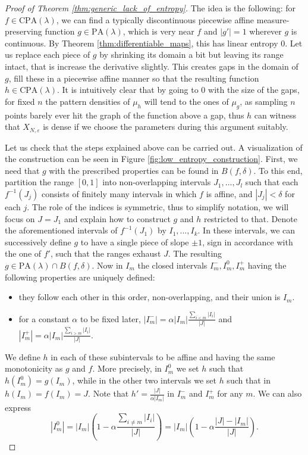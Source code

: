 \documentclass[11pt]{article}
\theoremstyle{definition}
\begin{document}
\begin{proof}[Proof of Theorem \ref{thm:generic_lack_of_entropy}]
The idea is the following: for $f\in \mathrm{CPA}(\lambda)$, we can find a typically discontinuous piecewise affine measure-preserving function $g\in\mathrm{PA}(\lambda)$, which is very near $f$ and $|g'|=1$ wherever $g$ is continuous. By Theorem \ref{thm:differentiable_maps}, this has linear entropy 0. Let us replace each piece of $g$ by shrinking its domain a bit but leaving its range intact, that is increase the derivative slightly. This creates gaps in the domain of $g$, fill these in a piecewise affine manner so that the resulting function $h\in\mathrm{CPA}(\lambda)$. It is intuitively clear that by going to 0 with the size of the gaps, for fixed $n$ the pattern densities of $\mu_h$ will tend to the ones of $\mu_g$, as sampling $n$ points barely ever hit the graph of the function above a gap, thus $h$ can witness that $X_{N, \varepsilon}$ is dense if we choose the parameters during this argument suitably.

    Let us check that the steps explained above can be carried out. A visualization of the construction can be seen in Figure \ref{fig:low_entropy_construction}. First, we need that $g$ with the prescribed properties can be found in $B(f, \delta)$. To this end, partition the range $[0,1]$ into non-overlapping intervals $J_1, ..., J_l$ such that each $f^{-1}(J_j)$ consists of finitely many intervals in which $f$ is affine, and $|J_j|<\delta$ for each $j$. The role of the indices is symmetric, thus to simplify notation, we will focus on $J=J_1$ and explain how to construct $g$ and $h$ restricted to that. Denote the aforementioned intervals of $f^{-1}(J_1)$ by $I_1, ..., I_k$. In these intervals, we can successively define $g$ to have a single piece of slope $\pm 1$, sign in accordance with the one of $f'$, such that the ranges exhaust $J$. The resulting $g\in \mathrm{PA}(\lambda)\cap B(f, \delta)$. Now in $I_m$ the closed intervals $I_m^{-},I_m^{0}, I_m^{+}$ having the following properties are uniquely defined:
\begin{itemize}
    \item they follow each other in this order, non-overlapping, and their union is $I_m$.
    \item for a constant $\alpha$ to be fixed later, $|I_m^{-}| = \alpha |I_m|\frac{\sum_{i<m}|I_i|}{|J|}$ and $|I_m^{+}| = \alpha |I_m|\frac{\sum_{i>m}|I_i|}{|J|}.$
\end{itemize}
We define $h$ in each of these subintervals to be affine and having the same monotonicity as $g$ and $f$. More precisely, in $I_m^{0}$ we set $h$ such that $h(I_m^{0})=g(I_m)$, while in the other two intervals we set $h$ such that in $h(I_m)=f(I_m)=J$. Note that $h'=\frac{|J|}{\alpha|I_m|}$ in $I_m^{-}$ and $I_m^{+}$ for any $m$. We can also express
$$|I_m^{0}| = |I_m|\left(1-\alpha \frac{\sum_{i\neq m}|I_i|}{|J|}\right)=|I_m|\left(1-\alpha \frac{|J|-|I_m|}{|J|}\right).$$


\end{proof}
\end{document}
